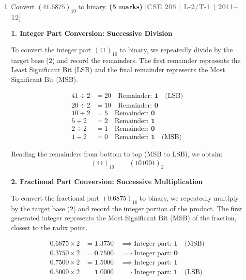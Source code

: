 \documentclass[12pt,a3paper]{article}
\newcommand{\yr}[1]{\hfill\textcolor{gray}{\small\textbf{[#1]}}}
\newcommand{\mk}[1]{\textcolor{orange!70!black}{\small\textbf{(#1 marks)}}}
\begin{document}
\begin{enumerate}
\item Convert $(41.6875)_{10}$ to binary.
\mk{5} \yr{CSE 205 | L-2/T-1 | 2011--12}

\begin{tcolorbox}[enhanced,breakable,ansbox,colback=cD!4,colframe=cD,boxrule=0.8pt,arc=5pt,title={\textbf{Answer}},fonttitle=\bfseries\color{white},colbacktitle=cD]

\textbf{\textcolor{cD}{1. Integer Part Conversion: Successive Division}}

To convert the integer part $(41)_{10}$ to binary, we repeatedly divide by the target base ($2$) and record the remainders. The first remainder represents the Least Significant Bit (LSB) and the final remainder represents the Most Significant Bit (MSB).

\begin{align*}
    41 \div 2 &= 20 \quad \text{Remainder: } \mathbf{1} \quad \text{(LSB)} \\
    20 \div 2 &= 10 \quad \text{Remainder: } \mathbf{0} \\
    10 \div 2 &= 5 \quad \text{Remainder: } \mathbf{0} \\
    5 \div 2 &= 2 \quad \text{Remainder: } \mathbf{1} \\
    2 \div 2 &= 1 \quad \text{Remainder: } \mathbf{0} \\
    1 \div 2 &= 0 \quad \text{Remainder: } \mathbf{1} \quad \text{(MSB)}
\end{align*}

Reading the remainders from bottom to top (MSB to LSB), we obtain:
\begin{align*}
    (41)_{10} &= (101001)_{2}
\end{align*}

\vspace{1em}
\textbf{\textcolor{cD}{2. Fractional Part Conversion: Successive Multiplication}}

To convert the fractional part $(0.6875)_{10}$ to binary, we repeatedly multiply by the target base ($2$) and record the integer portion of the product. The first generated integer represents the Most Significant Bit (MSB) of the fraction, closest to the radix point.

\begin{align*}
    0.6875 \times 2 &= \mathbf{1}.3750 \quad \implies \text{Integer part: } \mathbf{1} \quad \text{(MSB)} \\
    0.3750 \times 2 &= \mathbf{0}.7500 \quad \implies \text{Integer part: } \mathbf{0} \\
    0.7500 \times 2 &= \mathbf{1}.5000 \quad \implies \text{Integer part: } \mathbf{1} \\
    0.5000 \times 2 &= \mathbf{1}.0000 \quad \implies \text{Integer part: } \mathbf{1} \quad \text{(LSB)}
\end{align*}


\end{tcolorbox}
\end{enumerate}
\end{document}
